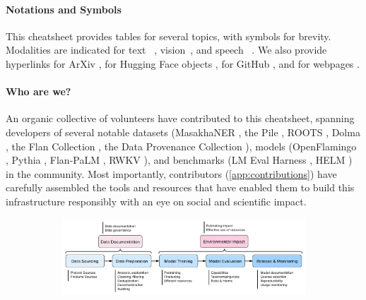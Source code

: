 \paragraph{Notations and Symbols}
This cheatsheet provides tables for several topics, with symbols for brevity.
Modalities are indicated for text ~\TextCircle[0.75]{}, vision~\VisionCircle[0.75]{}, and speech ~\SpeechCircle[0.75].
We also provide hyperlinks for ArXiv \earxiv[1.2em][-0.4ex]\hspace{0.25em}, for Hugging Face objects \ehf[1.2em][-0.4ex]\hspace{0.25em}, for GitHub \egithub[1.2em][-0.4ex]\hspace{0.25em}, and for webpages \eweb[1.2em][-0.4ex]\hspace{0.25em}.

\paragraph{Who are we?}
An organic collective of volunteers have contributed to this cheatsheet, spanning developers of several notable datasets (MasakhaNER \citep{adelani2021masakhaner}, the Pile \citep{gao2020pile}, ROOTS \citep{NEURIPS2022_ce9e92e3}, Dolma \citep{dolma}, the Flan Collection \citep{longpre2023flan}, the Data Provenance Collection \citep{longpre2023data}), models (OpenFlamingo \citep{awadalla2023openflamingo}, Pythia \citep{biderman2023pythia}, Flan-PaLM \citep{chung2022scaling}, RWKV \citep{peng2023rwkv}), and benchmarks (LM Eval Harness \citep{eval-harness}, HELM \citep{liang2022holistic}) in the community.
Most importantly, contributors (\cref{app:contributions}) have carefully assembled the tools and resources that have enabled them to build this infrastructure responsibly with an eye on social and scientific impact.

\begin{figure}[ht]
    \centering
    \begin{subfigure}{0.94\textwidth}
        \includegraphics[width=\textwidth]{logos/cheatsheet-flow.pdf}
    \end{subfigure}
    \label{fig:cheatsheet-flow}
    \vspace{-3mm}
\end{figure}

